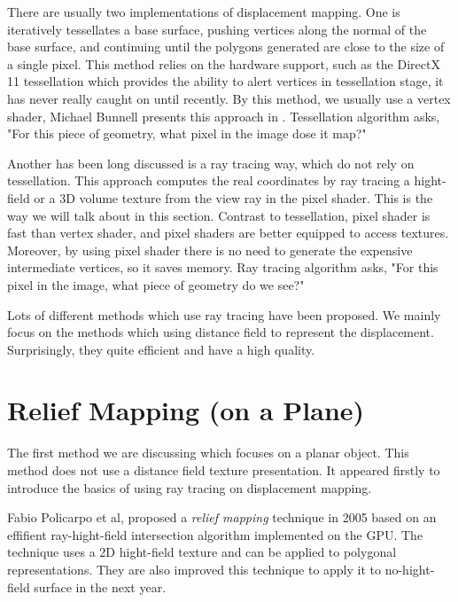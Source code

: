 There are usually two implementations of displacement mapping. One is iteratively tessellates a base surface, pushing vertices along the normal of the base surface, and continuing until the polygons generated are close to the size of a single pixel. This method relies on the hardware support, such as the DirectX 11 tessellation which provides the ability to alert vertices in tessellation stage, it has never really caught on until recently. By this method, we usually use a vertex shader, Michael Bunnell presents this approach in \cite{a:AdaptiveTessellationofSubdivisionSurfaceswithDisplacementMapping}. Tessellation algorithm asks, "For this piece of geometry, what pixel in the image dose it map?"

Another has been long discussed is a ray tracing way, which do not rely on tessellation. This approach computes the real coordinates by ray tracing a hight-field or a 3D volume texture from the view ray in the pixel shader. This is the way we will talk about in this section. Contrast to tessellation, pixel shader is fast than vertex shader, and pixel shaders are better equipped to access textures. Moreover, by using pixel shader there is no need to generate the expensive intermediate vertices, so it saves memory. Ray tracing algorithm asks, "For this pixel in the image, what piece of geometry do we see?"

Lots of different methods which use ray tracing have been proposed. We mainly focus on the methods which using distance field to represent the displacement. Surprisingly, they quite efficient and have a high quality. 


\section{Relief Mapping (on a Plane)}
The first method we are discussing which focuses on a planar object. This method does not use a distance field texture presentation. It appeared firstly to introduce the basics of using ray tracing on displacement mapping.  

Fabio Policarpo et al, proposed a \textit{relief mapping} technique in 2005\cite{a:Real-TimeReliefMappingonArbitraryPolygonalSurfaces} based on an effifient ray-hight-field intersection algorithm implemented on the GPU. The technique uses a 2D hight-field texture and can be applied to polygonal representations. They are also improved this technique to apply it to no-hight-field \cite{a:ReliefMappingofNo-Height-FieldSurfaceDetails} surface in the next year. 

